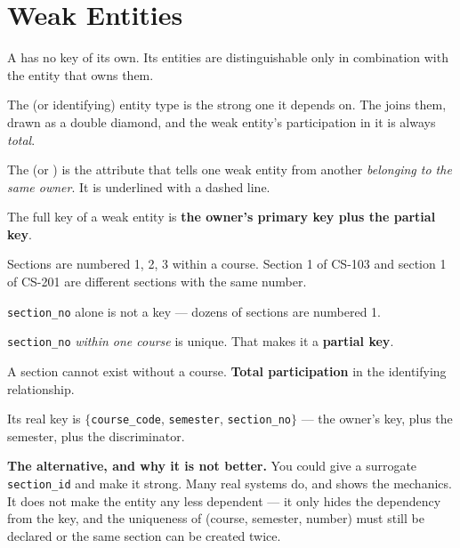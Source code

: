 \section{Weak Entities}

\begin{definitionbox}
A  has no key of its own. Its entities are
distinguishable only in combination with the entity that owns them.

\smallskip
The  (or identifying) entity type is the strong one it depends on.
The  joins them, drawn as a double diamond, and
the weak entity's participation in it is always \emph{total}.

\smallskip
The  (or ) is the attribute that tells
one weak entity from another \emph{belonging to the same owner}. It is
underlined with a dashed line.

\smallskip
The full key of a weak entity is \textbf{the owner's primary key plus the
partial key}.
\end{definitionbox}

\begin{examplebox}
Sections are numbered 1, 2, 3 within a course. Section 1 of CS-103 and section
1 of CS-201 are different sections with the same number.

\begin{tight}
  \item \texttt{section\_no} alone is not a key --- dozens of sections are
        numbered 1.
  \item \texttt{section\_no} \emph{within one course} is unique. That makes it
        a \textbf{partial key}.
  \item A section cannot exist without a course. \textbf{Total participation}
        in the identifying relationship.
  \item Its real key is $\{$\texttt{course\_code}, \texttt{semester},
        \texttt{section\_no}$\}$ --- the owner's key, plus the semester,
        plus the discriminator.
\end{tight}

\smallskip
{}

\smallskip
\textbf{The alternative, and why it is not better.} You could give
 a surrogate \texttt{section\_id} and make it strong. Many real
systems do, and  shows the mechanics. It does not make the
entity any less dependent --- it only hides the dependency from the key, and
the uniqueness of (course, semester, number) must still be declared or the
same section can be created twice.
\end{examplebox}

